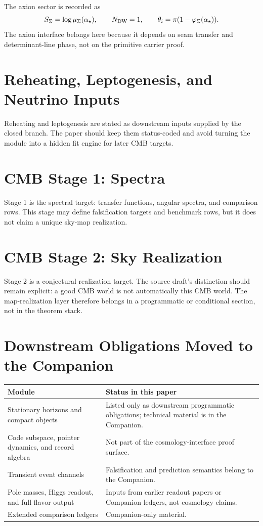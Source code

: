 \documentclass[11pt,a4paper]{article}
\begin{document}
The axion sector is recorded as
\[
S_\Sigma=\log\mu_\Sigma(\alpha_\star),
\qquad
N_{\mathrm{DW}}=1,
\qquad
\theta_i=\pi(1-\varphi_{\Sigma}(\alpha_\star)).
\]
The axion interface belongs here because it depends on seam transfer and determinant-line phase,
not on the primitive carrier proof.

\section{Reheating, Leptogenesis, and Neutrino Inputs}

Reheating and leptogenesis are stated as downstream inputs supplied by the closed branch. The paper
should keep them status-coded and avoid turning the module into a hidden fit engine for later CMB
targets.

\section{CMB Stage 1: Spectra}

Stage 1 is the spectral target: transfer functions, angular spectra, and comparison rows. This
stage may define falsification targets and benchmark rows, but it does not claim a unique sky-map
realization.

\section{CMB Stage 2: Sky Realization}

Stage 2 is a conjectural realization target. The source draft's distinction should remain explicit:
a good CMB world is not automatically this CMB world. The map-realization layer therefore belongs
in a programmatic or conditional section, not in the theorem stack.

\section{Downstream Obligations Moved to the Companion}

\begin{center}
\begin{tabularx}{\textwidth}{@{}p{}Y@{}}
\toprule
\textbf{Module} & \textbf{Status in this paper} \\
\midrule
Stationary horizons and compact objects & Listed only as downstream programmatic obligations; technical material is in the Companion. \\
Code subspace, pointer dynamics, and record algebra & Not part of the cosmology-interface proof surface. \\
Transient event channels & Falsification and prediction semantics belong to the Companion. \\
Pole masses, Higgs readout, and full flavor output & Inputs from earlier readout papers or Companion ledgers, not cosmology claims. \\
Extended comparison ledgers & Companion-only material. \\
\bottomrule
\end{tabularx}
\end{center}
\end{document}
